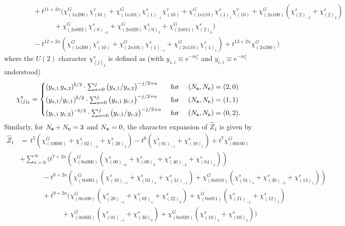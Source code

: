 \documentclass[letterpaper, 11pt]{article}
\newcommand{\nn}{\nonumber}
\begin{document}
{\begin{align}
&\qquad\quad+t^{11+2n}(\chi^G_{(1n200)}\chi^v_{(01)}+\chi^G_{(1n101)}\chi^s_{(1)_{-1}}\chi^v_{(10)}+\chi^G_{(1n110)}\chi^s_{(1)_1}\chi^v_{(10)}+\chi^G_{(2n100)}(\chi^s_{(2)_{-2}}+\chi^s_{(2)_2})\nn\\
&\qquad\qquad\qquad+\chi^G_{(2n002)}\chi^s_{(0)_{-2}}+\chi^G_{(2n020)}\chi^s_{(0)_2}+\chi^G_{(2n011)}\chi^s_{(2)_0})\nn\\
&\qquad\quad-t^{12+2n}(\chi^G_{(1n200)}\chi^v_{(10)}+\chi^G_{(2n101)}\chi^s_{(1)_{-1}}+\chi^G_{(2n110)}\chi^s_{(1)_1})+t^{13+2n}\chi^G_{(2n200)}\Big)
\end{align}
where the $U(2)$ character $\chi^s_{(j)_b}$ is defined as (with $y_{s,i} \equiv e^{-m_i^s}$ and $y_{c,i} \equiv e^{-m_i^c}$ understood)
\begin{align}
  \chi^s_{(j)_b} = \begin{dcases}
    (y_{s,1}\,y_{s,2})^{b/2} \cdot \textstyle\sum_{a=0}^{j} \big({y_{s,1}}/{y_{s,2}}\big)^{-j/2+a}& \text{ for } \quad (N_\mathbf{s}, N_\mathbf{c})=(2,0)\\
    (y_{s,1}/y_{c,1})^{b/2} \cdot \textstyle\sum_{a=0}^{j} \big(y_{s,1}\,y_{c,1}\big)^{-j/2+a}& \text{ for } \quad (N_\mathbf{s}, N_\mathbf{c})=(1,1)\\
    (y_{c,1}\,y_{c,2})^{-b/2} \cdot \textstyle\sum_{a=0}^{j} \big(y_{c,1}/y_{c,2}\big)^{-j/2+a}& \text{ for } \quad (N_\mathbf{s}, N_\mathbf{c})=(0,2).
  \end{dcases}
\end{align}
Similarly, for $N_{\bf s} + N_{\bf c} = 3$ and $N_{\bf v} = 0$, the character expansion of $\hat{Z}_1$ is given by 
\begin{align}
  \label{eq:so10-s3}
\hat{Z}_1&=\,t^5(\chi^G_{(10000)}+\chi^s_{(02)_{-2}}+\chi^s_{(20)_2})-t^6
(\chi^s_{(01)_{-1}}+\chi^s_{(10)_1})+t^7\chi^G_{(00100)}\nn\\
&+\textstyle\sum_{n=0}^{\infty}\Big(t^{7+2n}(\chi^G_{(0n000)}(\chi^s_{(00)_{-6}}+\chi^s_{(00)_6}+\chi^s_{(40)_{-2}}+\chi^s_{(04)_2}))\nn\\
&\qquad \quad \ -t^{8+2n}(\chi^G_{(0n001)}(\chi^s_{(10)_{-5}}+\chi^s_{(03)_3}+\chi^s_{(31)_{-1}})+\chi^G_{(0n010)}(\chi^s_{(01)_5}+\chi^s_{(30)_{-3}}+\chi^s_{(13)_1}))\nn\\
&\qquad \quad \ +t^{9+2n}(\chi^G_{(0n100)}(\chi^s_{(20)_{-4}}+\chi^s_{(02)_4}+\chi^s_{(22)_0})+\chi^G_{(0n011)}(\chi^s_{(21)_{-2}}+\chi^s_{(12)_2})\nn\\
& \qquad \qquad\qquad+\chi^G_{(0n002)}(\chi^s_{(01)_{-4}}+\chi^s_{(30)_0})+\chi^G_{(0n020)}(\chi^s_{(10)_4}+\chi^s_{(03)_0}))\\

\end{align}}
\end{document}
